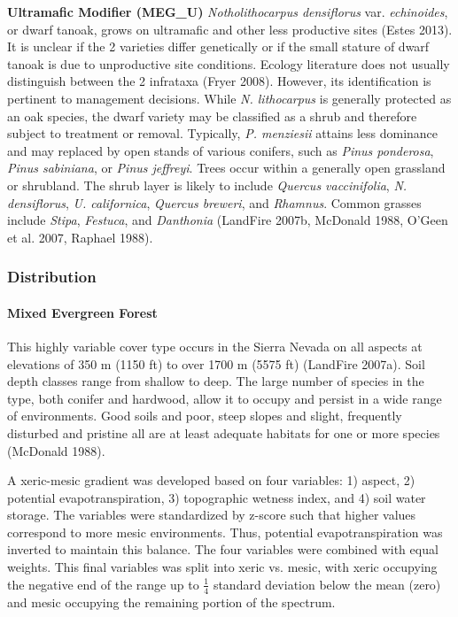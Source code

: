 \begin{adjustwidth}{2cm}{}
\medskip
\noindent \textbf{Ultramafic Modifier (MEG\_U)}
\emph{Notholithocarpus densiflorus} var. \emph{echinoides}, or dwarf tanoak, grows on ultramafic and other less productive sites (Estes 2013). It is unclear if the 2 varieties differ genetically or if the small stature of dwarf tanoak is due to unproductive site conditions. Ecology literature does not usually distinguish between the 2 infrataxa (Fryer 2008). However, its identification is pertinent to management decisions. While \emph{N. lithocarpus} is generally protected as an oak species, the dwarf variety may be classified as a shrub and therefore subject to treatment or removal. Typically, \emph{P. menziesii} attains less dominance and may replaced by open stands of various conifers, such as \emph{Pinus ponderosa}, \emph{Pinus sabiniana}, or \emph{Pinus jeffreyi}. Trees occur within a generally open grassland or shrubland. The shrub layer is likely to include \emph{Quercus vaccinifolia}, \emph{N. densiflorus}, \emph{U. californica}, \emph{Quercus breweri}, and \emph{Rhamnus}. Common grasses include \emph{Stipa}, \emph{Festuca}, and \emph{Danthonia} (LandFire 2007b, McDonald 1988, O'Geen et al. 2007, Raphael 1988). 

\end{adjustwidth}

\subsubsection{Distribution}
\paragraph{Mixed Evergreen Forest}		This highly variable cover type occurs in the Sierra Nevada on all aspects at elevations of 350 m (1150 ft) to over 1700 m (5575 ft) (LandFire 2007a). Soil depth classes range from shallow to deep. The large number of species in the type, both conifer and hardwood, allow it to occupy and persist in a wide range of environments. Good soils and poor, steep slopes and slight, frequently disturbed and pristine all are at least adequate habitats for one or more species (McDonald 1988).

A xeric-mesic gradient was developed based on four variables: 1) aspect, 2) potential evapotranspiration, 3) topographic wetness index, and 4) soil water storage. The variables were standardized by z-score such that higher values correspond to more mesic environments. Thus, potential evapotranspiration was inverted to maintain this balance. The four variables were combined with equal weights. This final variables was split into xeric vs. mesic, with xeric occupying the negative end of the range up to $\frac{1}{4}$ standard deviation below the mean (zero) and mesic occupying the remaining portion of the spectrum.

